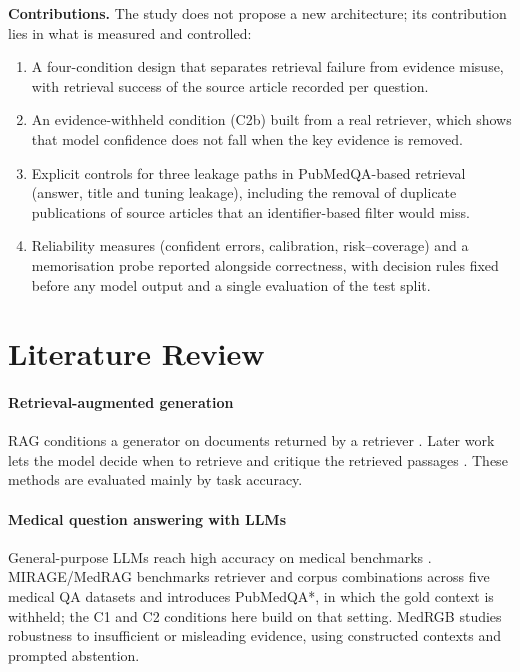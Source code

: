 \documentclass[conference]{IEEEtran}
\begin{document}
\textbf{Contributions.} The study does not propose a new architecture; its
contribution lies in what is measured and controlled:
\begin{enumerate}
\item A four-condition design that separates retrieval failure from evidence
misuse, with retrieval success of the source article recorded per question.
\item An evidence-withheld condition (C2b) built from a real retriever, which
shows that model confidence does not fall when the key evidence is removed.
\item Explicit controls for three leakage paths in PubMedQA-based retrieval
(answer, title and tuning leakage), including the removal of duplicate
publications of source articles that an identifier-based filter would miss.
\item Reliability measures (confident errors, calibration, risk--coverage) and
a memorisation probe reported alongside correctness, with decision rules fixed
before any model output and a single evaluation of the test split.
\end{enumerate}

\section{Literature Review}

\paragraph*{Retrieval-augmented generation}
RAG conditions a generator on documents returned by a retriever
\cite{lewis2020rag}. Later work lets the model decide when to retrieve and
critique the retrieved passages \cite{asai2024selfrag}. These methods are
evaluated mainly by task accuracy.

\paragraph*{Medical question answering with LLMs}
General-purpose LLMs reach high accuracy on medical benchmarks
\cite{singhal2023medpalm}. MIRAGE/MedRAG \cite{xiong2024medrag} benchmarks
retriever and corpus combinations across five medical QA datasets and introduces
PubMedQA*, in which the gold context is withheld; the C1 and C2 conditions here
build on that setting. MedRGB \cite{ngo2024medrgb} studies robustness to
insufficient or misleading evidence, using constructed contexts and prompted
abstention.
\end{document}
